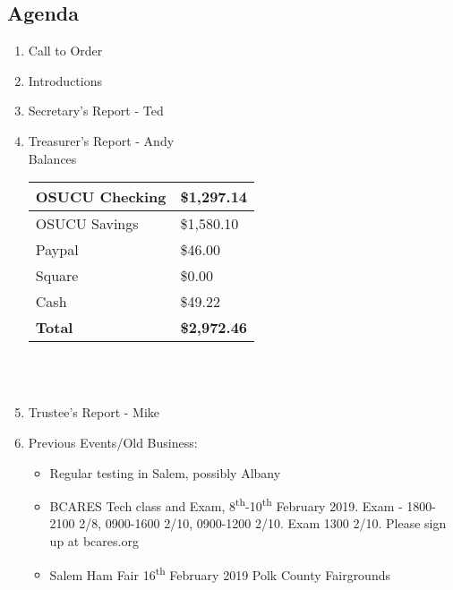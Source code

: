 \documentclass[letter,11pt]{extarticle}
\begin{document}
	\subsection*{Agenda}
	\begin{enumerate}
		\item Call to Order
		\item Introductions
		\item Secretary's Report - Ted
		\item Treasurer's Report - Andy \\
				Balances 
			\begin{tabular}{|l|l|} \hline
				OSUCU Checking & \$1,297.14 \\ \hline
				OSUCU Savings & \$1,580.10 \\ \hline
				Paypal & \$46.00 \\ \hline
				Square & \$0.00 \\ \hline
				Cash & \$49.22 \\ \hline
				\textbf{Total} & \textbf{\$2,972.46} \\ \hline
			\end{tabular} \\ \\
		\item Trustee's Report - Mike
		\item Previous Events/Old Business:
		\begin{itemize}
			\item Regular testing in Salem, possibly Albany
			\item BCARES Tech class and Exam, 8\textsuperscript{th}-10\textsuperscript{th} February 2019. Exam - 1800-2100 2/8, 0900-1600 2/10, 0900-1200 2/10. Exam 1300 2/10. Please sign up at bcares.org 
			\item Salem Ham Fair 16\textsuperscript{th} February 2019 Polk County Fairgrounds
		\end{itemize}
			

\end{enumerate}
\end{document}
